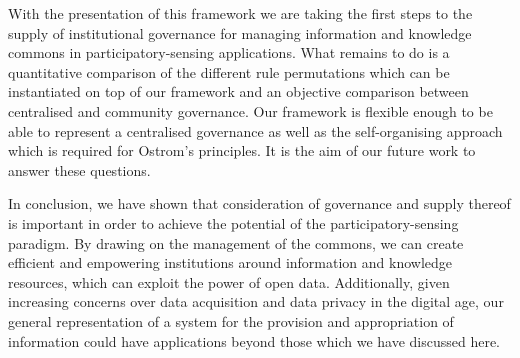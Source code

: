With the presentation of this framework we are taking the first steps to the supply of institutional governance for managing information and knowledge commons in participatory-sensing applications.
What remains to do is a quantitative comparison of the different rule permutations which can be instantiated on top of our framework and an objective comparison between centralised and community governance. 
Our framework is flexible enough to be able to represent a centralised governance as well as the self-organising approach which is required for Ostrom's principles. 
It is the aim of our future work to answer these questions.

In conclusion, we have shown that consideration of governance and supply thereof is important in order to achieve the potential of the participatory-sensing paradigm. 
By drawing on the management of the commons, we can create efficient and empowering institutions around information and knowledge resources, which can exploit the power of open data. 
Additionally, given increasing concerns over data acquisition and data privacy in the digital age, our general representation of a system for the provision and appropriation of information could have applications beyond those which we have discussed here.